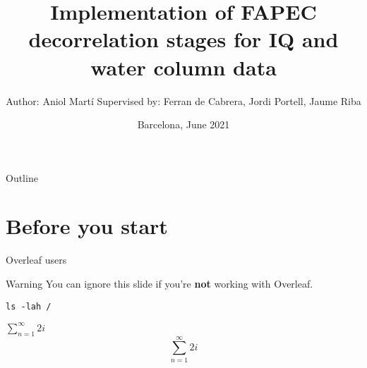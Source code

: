 \documentclass[usenames,dvipsnames]{beamer}
\title[FAPEC]{Implementation of FAPEC decorrelation stages for IQ and water column data}
\date[June 2021]{Barcelona, June 2021}
\author[Aniol Marti]{
  Author: Aniol Martí
  \newline
  Supervised by: Ferran de Cabrera, Jordi Portell, Jaume Riba
}
\institute{Universitat Politècnica de Catalunya}
\begin{document}
\begin{frame}
\titlepage
\end{frame}

\begin{frame}{Outline}
\tableofcontents
\end{frame}

\section{Before you start}
\begin{frame}{Overleaf users}
	
	\begin{alertblock}{Warning}
		You can ignore this slide if you're \textbf{not} working with Overleaf.
	\end{alertblock}
\texttt{ls -lah /}

$\sum_{n=1}^{\infty} 2i$
\[
\sum_{n=1}^{\infty} 2i
\]
\end{frame}
\end{document}
